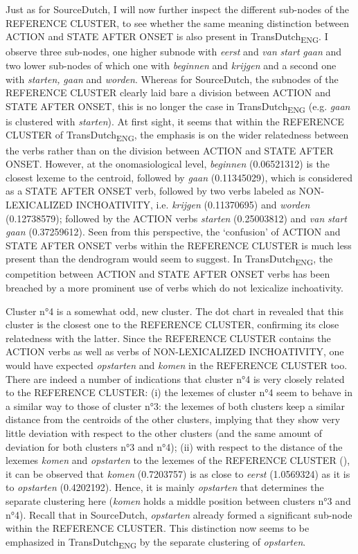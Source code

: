 Just as for SourceDutch, I will now further inspect the different sub-nodes of the REFERENCE CLUSTER, to see whether the same meaning distinction between ACTION and STATE AFTER ONSET is also present in TransDutch\textsubscript{ENG}. I observe three sub-nodes, one higher subnode with \textit{eerst} and \textit{van} \textit{start} \textit{gaan} and two lower sub-nodes of which one with \textit{beginnen} and \textit{krijgen} and a second one with \textit{starten,} \textit{gaan} and \textit{worden}. Whereas for SourceDutch, the subnodes of the REFERENCE CLUSTER clearly laid bare a division between ACTION and STATE AFTER ONSET, this is no longer the case in TransDutch\textsubscript{ENG} (e.g. \textit{gaan} is clustered with \textit{starten}). At first sight, it seems that within the REFERENCE CLUSTER of TransDutch\textsubscript{ENG}, the emphasis is on the wider relatedness between the verbs rather than on the division between ACTION and STATE AFTER ONSET. However, at the onomasiological level, \textit{beginnen} (0.06521312) is the closest lexeme to the centroid, followed by \textit{gaan} (0.11345029), which is considered as a STATE AFTER ONSET verb, followed by two verbs labeled as {NON-LEXICALIZED INCHOATIVITY}, i.e. \textit{krijgen} (0.11370695) and \textit{worden} (0.12738579); followed by the ACTION verbs \textit{starten} (0.25003812) and \textit{van} \textit{start} \textit{gaan} (0.37259612). Seen from this perspective, the ‘confusion’ of ACTION and STATE AFTER ONSET verbs within the REFERENCE CLUSTER is much less present than the dendrogram would seem to suggest. In TransDutch\textsubscript{ENG}, the competition between ACTION and STATE AFTER ONSET verbs has been breached by a more prominent use of verbs which do not lexicalize inchoativity.

Cluster n°4 is a somewhat odd, new cluster. The dot chart in  revealed that this cluster is the closest one to the REFERENCE CLUSTER, confirming its close relatedness with the latter. Since the REFERENCE CLUSTER contains the ACTION verbs as well as verbs of {NON-LEXICALIZED INCHOATIVITY}, one would have expected \textit{opstarten} and \textit{komen} in the REFERENCE CLUSTER too. There are indeed a number of indications that cluster n°4 is very closely related to the REFERENCE CLUSTER: (i) the lexemes of cluster n°4 seem to behave in a similar way to those of cluster n°3: the lexemes of both clusters keep a similar distance from the centroids of the other clusters, implying that they show very little deviation with respect to the other clusters (and the same amount of deviation for both clusters n°3 and n°4); (ii) with respect to the distance of the lexemes \textit{komen} and \textit{opstarten} to the lexemes of the REFERENCE CLUSTER (), it can be observed that \textit{komen} (0.7203757) is as close to \textit{eerst} (1.0569324) as it is to \textit{opstarten} (0.4202192). Hence, it is mainly \textit{opstarten} that determines the separate clustering here (\textit{komen} holds a middle position between clusters n°3 and n°4). Recall that in SourceDutch, \textit{opstarten} already formed a significant sub-node within the REFERENCE CLUSTER. This distinction now seems to be emphasized in TransDutch\textsubscript{ENG} by the separate clustering of \textit{opstarten}.

